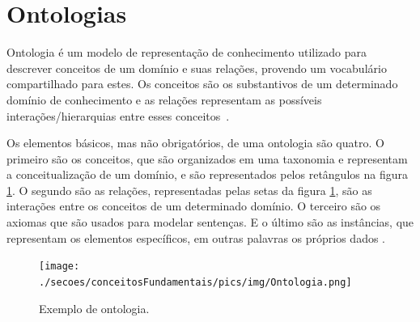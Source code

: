 \section{Ontologias}\label{SEC_ONTOLOGIA}
Ontologia é um modelo de representação de conhecimento utilizado para descrever conceitos de um domínio e suas relações, provendo um vocabulário compartilhado para estes. Os conceitos são os substantivos de um determinado domínio de conhecimento e as relações representam as possíveis interações/hierarquias entre esses conceitos~\cite{Umamaheswari2012}.

Os elementos básicos, mas não obrigatórios, de uma ontologia são quatro. O primeiro são os conceitos, que são organizados em uma taxonomia e representam a conceitualização de um domínio, e são representados pelos retângulos na figura \ref{figura_ontologia}. O segundo são as relações, representadas pelas setas da figura \ref{figura_ontologia}, são as interações entre os conceitos de um determinado domínio. O terceiro são os axiomas que são usados para modelar sentenças. E o último são as instâncias, que representam os elementos específicos, em outras palavras os próprios dados \cite{ALMEIDA2003}. 
\begin{figure}[!hbt]
    \centering   
    \caption{Exemplo de ontologia.}
    \texttt{[image: ./secoes/conceitosFundamentais/pics/img/Ontologia.png]}
	\label{figura_ontologia}
\end{figure}

